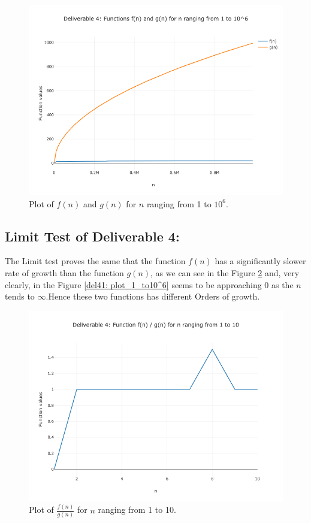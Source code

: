 \documentclass{article}
\begin{document}
\begin{figure}[H]
    \centering
    \includegraphics[width=\textwidth]{Deliverable 4: plot_1_to_1000000.png}
    \caption{Plot of $f(n)$ and $g(n)$ for $n$ ranging from 1 to $10^6$.}
    \label{del4: plot_1_to10^6}
\end{figure}

\subsection{Limit Test of Deliverable 4: }
The Limit test proves the same that the function \(f(n)\) has a significantly slower rate of growth than the function \(g(n)\), as we can see in the Figure \ref{del41: plot_1_to_10} and, very clearly, in the Figure \ref{del41: plot_1_to10^6} seems to be approaching 0 as the \(n\) tends to \(\infty\).Hence these two functions has different Orders of growth.
\begin{figure}[H]
    \centering
    \includegraphics[width=\textwidth]{Deliverable 41: plot_1_to_10.png}
    \caption{Plot of \(\frac{f(n)}{g(n)}\) for $n$ ranging from 1 to 10.}
    \label{del41: plot_1_to_10}
\end{figure}
\end{document}
